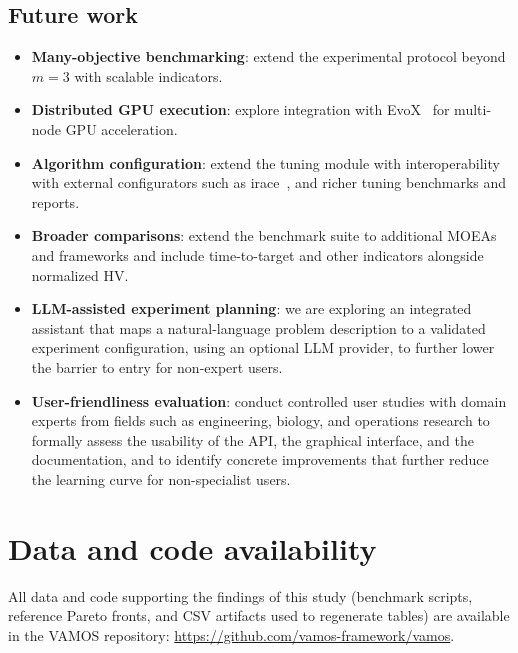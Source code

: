 \documentclass[journal]{IEEEtran}
\newcommand{\VAMOS}{VAMOS}
\begin{document}
\subsection{Future work}
\begin{itemize}
  \item \textbf{Many-objective benchmarking}: extend the experimental protocol beyond $m=3$ with scalable indicators.
  \item \textbf{Distributed GPU execution}: explore integration with EvoX~\cite{HCL+25} for multi-node GPU acceleration.
  \item \textbf{Algorithm configuration}: extend the tuning module with interoperability with external configurators such as irace~\cite{LDP+16}, and richer tuning benchmarks and reports.
  \item \textbf{Broader comparisons}: extend the benchmark suite to additional MOEAs and frameworks and include time-to-target and other indicators alongside normalized HV.
  \item \textbf{LLM-assisted experiment planning}: we are exploring an integrated assistant that maps a natural-language problem description to a validated experiment configuration, using an optional LLM provider, to further lower the barrier to entry for non-expert users.
  \item \textbf{User-friendliness evaluation}: conduct controlled user studies with domain experts from fields such as engineering, biology, and operations research to formally assess the usability of the API, the graphical interface, and the documentation, and to identify concrete improvements that further reduce the learning curve for non-specialist users.
\end{itemize}

\section*{Data and code availability}
All data and code supporting the findings of this study (benchmark
scripts, reference Pareto fronts, and CSV artifacts used to regenerate
tables) are available in the \VAMOS{} repository:\newline
\url{https://github.com/vamos-framework/vamos}.

\appendices
\end{document}
